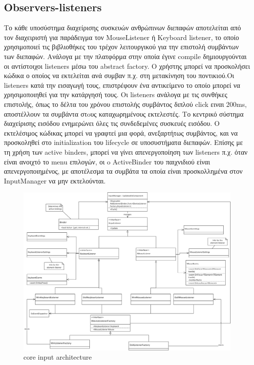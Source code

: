 	\subsection{Observers-listeners}
	Το κάθε υποσύστημα διαχείρισης συσκευών ανθρώπινων διεπαφών αποτελείται από τον διαχειριστή για παράδειγμα τον MouseListener ή Keyboard listener, το οποίο χρησιμοποιεί τις βιβλιοθήκες του τρέχον λειτουργικού για την επιστολή συμβάντων των διεπαφών. Ανάλογα με την πλατφόρμα στην οποία έγινε compile δημιουργούνται οι αντίστοιχοι listeners μέσω του abstract factory.
	Ο χρήστης μπορεί να προσκολήσει κώδικα ο οποίος να εκτελείται ανά συμβαν π.χ. στη μετακίνηση του ποντικιού.Οι listeners κατά την εισαγωγή τους, επιστρέφουν ένα αντικείμενο το οποίο μπορεί να χρησιμοποιηθεί για την κατάργησή τους. Οι listeners ανάλογα με τις συνθήκες επιστολής, όπως το δέλτα του χρόνου επιστολής συμβάντος διπλού click ειναι 200ms, αποστέλλουν τα συμβάντα στoυς καταχωρημένους εκτελεστές. Το κεντρικό σύστημα διαχείρισης εισόδου ενημερώνει όλες τις συνδεδεμένες συσκευές εισόδου. 
	Ο εκτελέσιμος κώδικας μπορεί να γραφτεί μια φορά, ανεξαρτήτως συμβάντος, και να προσκοληθεί στο initialization του lifecycle σε υποσυστήματα διεπαφών. Επίσης με τη χρήση των active binders, μπορεί να γίνει απενεργοποίηση των listeners π.χ. όταν είναι ανοιχτό το menu επιλογών, οι o ActiveBinder του παιχνιδιού είναι απενεργοποιημένος, με αποτέλεσμα τα συμβάτα τα οποία είναι προσκολλημένα στον InputManager να μην εκτελούνται.
	
	\begin{figure}[h!]
		\centering
		\includegraphics[width=165mm]{Images/core_input}
		\caption{core input architecture}
		\label{fig:core_input}
	\end{figure}
		
